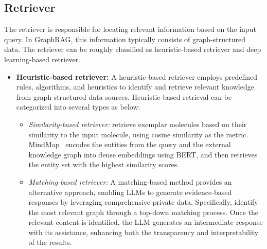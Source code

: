 \subsection{Retriever}
The retriever is responsible for locating relevant information based on the input query. In GraphRAG, this information typically consists of graph-structured data.  The retriever can be roughly classified as heuristic-based retriever and deep learning-based retriever.
 


\begin{itemize}[leftmargin=*]
    \item \textbf{Heuristic-based retriever:} A heuristic-based retriever employs predefined rules, algorithms, and heuristics to identify and retrieve relevant knowledge from graph-structured data sources. Heuristic-based retrieval can be categorized into several types as below:
    
    \begin{itemize}[leftmargin=*]
        \item \textit{Similarity-based retriever:} \citet{wangretrieval} retrieve exemplar molecules based on their similarity to the input molecule, using cosine similarity as the metric. MindMap~\cite{wen2023mindmap} encodes the entities from the query and the external knowledge graph into dense embeddings using BERT, and then retrieves the entity set with the highest similarity scores.
    
        \item \textit{Matching-based retriever:} A matching-based method provides an alternative approach, enabling LLMs to generate evidence-based responses by leveraging comprehensive private data. Specifically, \citet{wu2024medical} identify the most relevant graph through a top-down matching process. Once the relevant content is identified, the LLM generates an intermediate response with its assistance, enhancing both the transparency and interpretability of the results.


\end{itemize}
\end{itemize}
